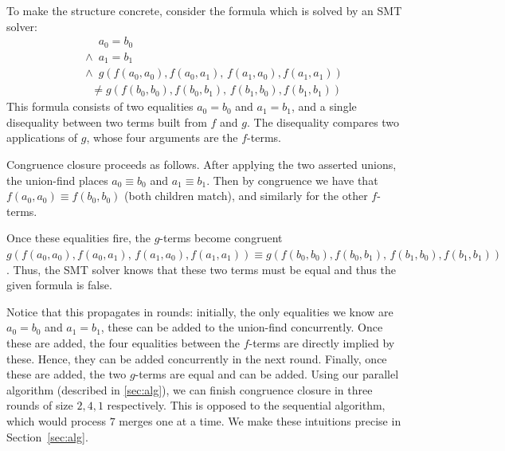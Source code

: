 To make the structure concrete, consider the formula which is solved by an SMT
solver:
%
\begin{equation}\label{ex:formula}
\begin{aligned}
& \;\;\;\;\;\; a_0 = b_0 \\
&\;\land\; a_1 = b_1 \\
&\;\land\;g(f(a_0, a_0), f(a_0, a_1),\, f(a_1, a_0), f(a_1, a_1)) \\
& \quad \neq g(f(b_0, b_0), f(b_0, b_1),\, f(b_1, b_0), f(b_1, b_1))
\end{aligned}
\end{equation}
%
This formula consists of two equalities $a_0 = b_0$ and $a_1 = b_1$, and a single
disequality between two terms built from $f$ and $g$. The disequality compares
two applications of $g$, whose four arguments are the $f$-terms.

Congruence closure proceeds as follows. After applying the two asserted unions, the
union-find places $a_0 \equiv b_0$ and $a_1 \equiv b_1$. Then by congruence
we have that $f(a_0, a_0) \equiv f(b_0, b_0)$ (both children match),
and similarly for the other $f$-terms. 

Once these equalities fire, the $g$-terms become
congruent $g(f(a_0, a_0), f(a_0, a_1),\, f(a_1, a_0), f(a_1, a_1)) \equiv
g(f(b_0, b_0), f(b_0, b_1),\, f(b_1, b_0), f(b_1, b_1))$. Thus, the SMT solver
knows that these two terms must be equal and thus the given formula is false.

Notice that this propagates in rounds: initially, the only equalities we know 
are $a_0 = b_0$ and $a_1 = b_1$, these can be added to the union-find concurrently.
Once these are added, the four equalities between the $f$-terms are directly implied
by these. Hence, they can be added concurrently in the next round. Finally, once
these are added, the two $g$-terms are equal and can be added. Using 
our parallel algorithm (described in \autoref{sec:alg}), we can finish 
congruence closure in three rounds of size $2, 4, 1$ respectively. This is 
opposed to the sequential algorithm, which would process $7$ merges one at a time.
We make these intuitions precise in Section~\ref{sec:alg}.


